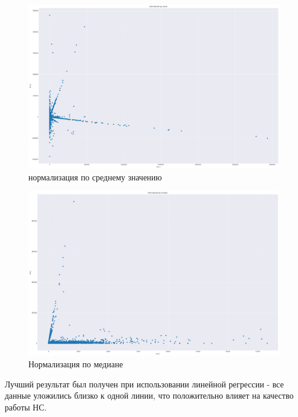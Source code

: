 \documentclass{article}
\begin{document}
\begin{figure}[!htp]
\includegraphics[width=\linewidth]{imgs/dist_mean.png}
  \caption{нормализация по среднему значению}\label{fig:dist_mean}
\end{figure}

\begin{figure}[!htp]
\includegraphics[width=\linewidth]{imgs/dist_med.png}
  \caption{Нормализация по медиане}\label{fig:dist_med}
\end{figure}

Лучший результат был получен при использовании линейной регрессии - все данные уложились близко к одной линии, что положительно влияет на качество работы НС.
\end{document}
